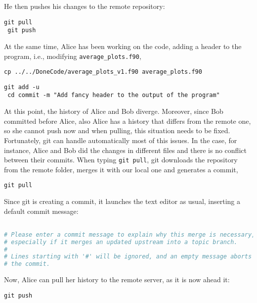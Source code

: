 \documentclass[a4paper,10pt]{article}
\begin{document}
He then pushes his changes to the remote repository:

\begin{lstlisting}[style=Bob]
 git pull 
 git push  
\end{lstlisting}

At the same time, Alice has been working on the code, adding a header to the program, i.e., modifying \texttt{average\_plots.f90},

\begin{lstlisting}[style=AliceFake]
 cp ../../DoneCode/average_plots_v1.f90 average_plots.f90
\end{lstlisting}

\begin{lstlisting}[style=Alice]
 git add -u
 cd commit -m "Add fancy header to the output of the program"
\end{lstlisting}

At this point, the history of Alice and Bob diverge. Moreover, since Bob committed before Alice, also Alice has a history that differs from the remote one, so she cannot push now and when pulling, this situation needs to be fixed. Fortunately, git can handle automatically most of this issues. In the case, for instance, Alice and Bob did the changes in different files and there is no conflict between their commits. When typing \texttt{git pull}, git downloads the repository from the remote folder, merges it with our local one and generates a commit,

\begin{lstlisting}[style=Alice]
 git pull
\end{lstlisting}
Since git is creating a commit, it launches the text editor as usual, inserting a default commit message:

\begin{lstlisting}[style=Text,language=bash,commentstyle=\color{blue},linewidth=1.06\linewidth,xleftmargin=0.05\linewidth]
%{\color{red!50!yellow!90!}Merge branch 'master' of cluster.unial.it:/home/git/AveragePlots}%

# Please enter a commit message to explain why this merge is necessary,
# especially if it merges an updated upstream into a topic branch.
#
# Lines starting with '#' will be ignored, and an empty message aborts
# the commit.
\end{lstlisting}

Now, Alice can pull her history to the remote server, as it is now ahead it:

\begin{lstlisting}[style=Alice]
 git push
\end{lstlisting}
\end{document}
